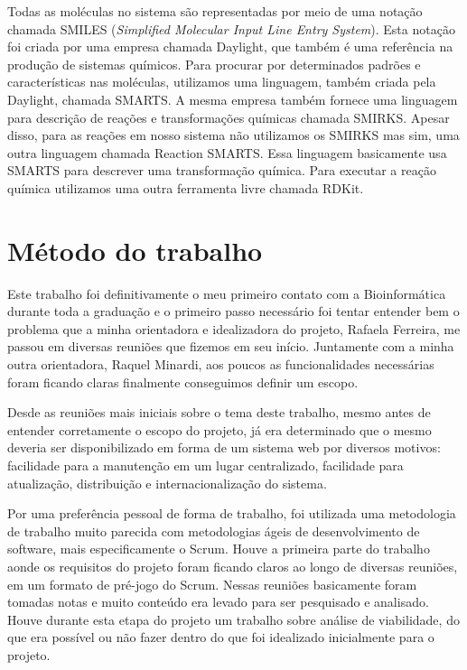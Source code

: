 \documentclass{abnt}
\begin{document}
Todas as moléculas no sistema são representadas por meio de uma notação chamada
SMILES (\textit{Simplified Molecular Input Line Entry System})\cite{DL_SMILES}. Esta notação foi criada
por uma empresa chamada Daylight, que também é uma referência na produção de sistemas
químicos. Para procurar por determinados padrões e características nas moléculas,
utilizamos uma linguagem, também criada pela Daylight, chamada SMARTS\cite{DL_SMARTS}. A mesma empresa
também fornece uma linguagem para descrição de reações e transformações químicas
chamada SMIRKS\cite{DL_SMIRKS}. Apesar disso, para as reações em nosso sistema não utilizamos os
SMIRKS mas sim, uma outra linguagem chamada Reaction SMARTS. Essa linguagem basicamente
usa SMARTS para descrever uma transformação química. Para executar a reação química
utilizamos uma outra ferramenta livre chamada RDKit\cite{RDKIT}.

\chapter{Método do trabalho}

Este trabalho foi definitivamente o meu primeiro contato com a Bioinformática durante
toda a graduação e o primeiro passo necessário foi tentar entender bem o problema
que a minha orientadora e idealizadora do projeto, Rafaela Ferreira, me passou em
diversas reuniões que fizemos em seu início. Juntamente com a minha
outra orientadora, Raquel Minardi, aos poucos as funcionalidades necessárias foram
ficando claras finalmente conseguimos definir um escopo.

Desde as reuniões mais iniciais sobre o tema deste trabalho, mesmo antes de entender
corretamente o escopo do projeto, já era determinado que o mesmo deveria ser disponibilizado
em forma de um sistema web por diversos motivos: facilidade para a manutenção em
um lugar centralizado, facilidade para atualização, distribuição e internacionalização
do sistema.

Por uma preferência pessoal de forma de trabalho, foi utilizada uma metodologia
de trabalho muito parecida com metodologias ágeis de desenvolvimento de software\cite{alliance2001agile},
mais especificamente o Scrum\cite{schwaber2011scrum}. Houve a primeira parte do trabalho aonde os requisitos
do projeto foram ficando claros ao longo de diversas reuniões, em um formato de
pré-jogo do Scrum. Nessas reuniões basicamente foram tomadas notas e muito conteúdo
era levado para ser pesquisado e analisado. Houve durante esta etapa do projeto
um trabalho sobre análise de viabilidade, do que era possível ou não fazer dentro
do que foi idealizado inicialmente para o projeto.
\end{document}
